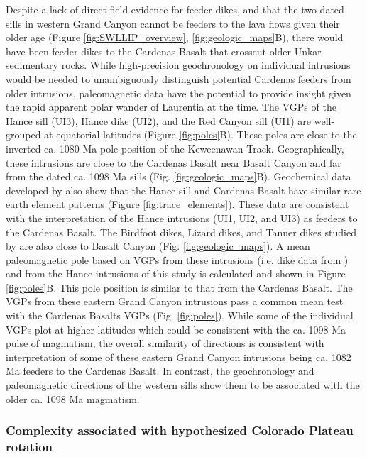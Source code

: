 Despite a lack of direct field evidence for feeder dikes, and that the two dated sills in western Grand Canyon cannot be feeders to the lava flows given their older age (Figure \ref{fig:SWLLIP_overview}, \ref{fig:geologic_maps}B), there would have been feeder dikes to the Cardenas Basalt that crosscut older Unkar sedimentary rocks. While high-precision geochronology on individual intrusions would be needed to unambiguously distinguish potential Cardenas feeders from older intrusions, paleomagnetic data have the potential to provide insight given the rapid apparent polar wander of Laurentia at the time. The VGPs of the Hance sill (UI3), Hance dike (UI2), and the Red Canyon sill (UI1) are well-grouped at equatorial latitudes (Figure \ref{fig:poles}B). These poles are close to the inverted ca. 1080 Ma pole position of the Keweenawan Track. Geographically, these intrusions are close to the Cardenas Basalt near Basalt Canyon and far from the dated ca. 1098 Ma sills (Fig. \ref{fig:geologic_maps}B). Geochemical data developed by \cite{Larson1994a} also show that the Hance sill and Cardenas Basalt have similar rare earth element patterns (Figure \ref{fig:trace_elements}). These data are consistent with the interpretation of the Hance intrusions (UI1, UI2, and UI3) as feeders to the Cardenas Basalt. The Birdfoot dikes, Lizard dikes, and Tanner dikes studied by \cite{Weil2003a} are also close to Basalt Canyon (Fig. \ref{fig:geologic_maps}). A mean paleomagnetic pole based on VGPs from these intrusions (i.e. dike data from \cite{Weil2003a}) and from the Hance intrusions of this study is calculated and shown in Figure \ref{fig:poles}B. This pole position is similar to that from the Cardenas Basalt. The VGPs from these eastern Grand Canyon intrusions pass a common mean test with the Cardenas Basalts VGPs (Fig. \ref{fig:poles}). While some of the individual VGPs plot at higher latitudes which could be consistent
with the ca. 1098 Ma pulse of magmatism, the overall similarity of directions is consistent with interpretation of some of these eastern Grand Canyon intrusions being ca. 1082 Ma feeders to the Cardenas Basalt. In contrast, the geochronology and paleomagnetic directions of the western sills show them to be associated with the older ca. 1098 Ma magmatism. 

\subsubsection{Complexity associated with hypothesized Colorado Plateau rotation}

